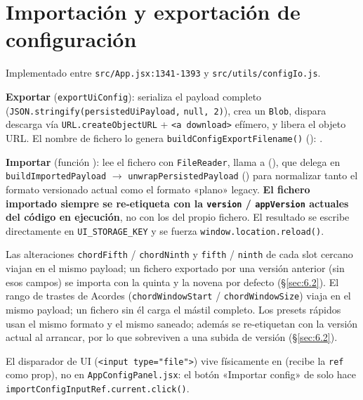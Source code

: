 \documentclass[a4paper,11pt,oneside]{report}
\newcommand{\Sref}[1]{\S\ref{#1}}
\begin{document}
\chapter{Importación y exportación de configuración}
\label{sec:12}

Implementado entre \lstinline!src/App.jsx:1341-1393! y \lstinline!src/utils/configIo.js!.

\begingroup
\sloppy
\raggedright
\setlength{\emergencystretch}{5em}

\textbf{Exportar} (\lstinline!exportUiConfig!): serializa el payload completo (\lstinline!JSON.stringify(persistedUiPayload,! \lstinline!null, 2)!), crea un \lstinline!Blob!, dispara descarga vía \lstinline!URL.createObjectURL! + \lstinline!<a download>! efímero, y libera el objeto URL. El nombre de fichero lo genera \lstinline!buildConfigExportFilename()! (\texttt{}): \texttt{}.

\textbf{Importar} (función \texttt{}): lee el fichero con \texttt{FileReader}, llama a \texttt{} (\texttt{}), que delega en \lstinline!buildImportedPayload! $\to$ \lstinline!unwrapPersistedPayload! (\texttt{}) para normalizar tanto el formato versionado actual como el formato «plano» legacy. \textbf{El fichero importado siempre se re-etiqueta con la \lstinline!version! / \lstinline!appVersion! actuales del código en ejecución}, no con los del propio fichero. El resultado se escribe directamente en \lstinline!UI_STORAGE_KEY! y se fuerza \lstinline!window.location.reload()!.
\endgroup

Las alteraciones \lstinline!chordFifth! / \lstinline!chordNinth! y \lstinline!fifth! / \lstinline!ninth! de cada slot cercano viajan en el mismo payload; un fichero exportado por una versión anterior (sin esos campos) se importa con la quinta y la novena por defecto (\Sref{sec:6.2}). El rango de trastes de Acordes (\lstinline!chordWindowStart! / \lstinline!chordWindowSize!) viaja en el mismo payload; un fichero sin él carga el mástil completo. Los presets rápidos usan el mismo formato y el mismo saneado; además se re-etiquetan con la versión actual al arrancar, por lo que sobreviven a una subida de versión (\Sref{sec:6.2}).

El disparador de UI (\lstinline!<input type="file">!) vive físicamente en \texttt{} (recibe la \lstinline!ref! como prop), no en \lstinline!AppConfigPanel.jsx!: el botón «Importar config» de \texttt{} solo hace \lstinline!importConfigInputRef.current.click()!.
\end{document}
